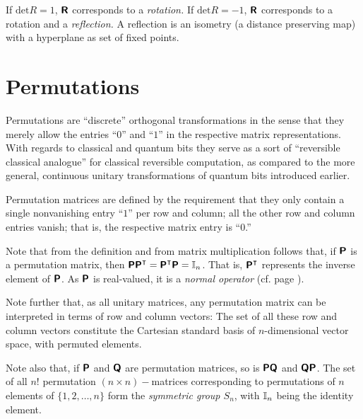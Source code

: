 If $\textrm{det} R=1$, $\textsf{\textbf{R}}$ corresponds to a {\em rotation.}
If $\textrm{det} R=-1$, $\textsf{\textbf{R}}$ corresponds to a rotation and a {\em reflection.}
A reflection is an isometry (a distance preserving map) with a hyperplane as set of fixed points.




\section{Permutations}
\label{2016-pu-ch-qm-perm}

Permutations are ``discrete'' orthogonal transformations in the sense that
they merely allow the entries ``$0$'' and ``$1$'' in the respective matrix representations.
With regards to classical and quantum bits \cite{mermin-04,mermin-07}
they serve as a sort of ``reversible classical analogue'' for classical reversible computation,
as compared to the more general, continuous unitary transformations of quantum bits introduced earlier.

Permutation matrices are defined by the requirement that they only contain a single nonvanishing entry ``$1$'' per row and column;
all the other row and column entries vanish; that is, the respective matrix entry is ``$0$.''


Note that from the definition and from matrix multiplication follows that,
if $\textsf{\textbf{P}}$ is a permutation matrix, then $\textsf{\textbf{P}} \textsf{\textbf{P}}^\intercal =\textsf{\textbf{P}}^\intercal  \textsf{\textbf{P}}={\Bbb I}_n$.
That is, $\textsf{\textbf{P}}^\intercal $ represents the inverse element of $\textsf{\textbf{P}}$.
As $\textsf{\textbf{P}}$ is real-valued, it is a {\em normal operator} (cf. page \pageref{2014-m-fdvs-normality}).


Note further that, as all unitary matrices, any permutation matrix can be interpreted in terms of row and column vectors:
The set of all these row and column vectors constitute the Cartesian standard basis of $n$-dimensional vector space,
with permuted elements.

Note also that, if $\textsf{\textbf{P}}$ and $\textsf{\textbf{Q}}$ are permutation matrices, so is $\textsf{\textbf{P}}\textsf{\textbf{Q}}$
and $\textsf{\textbf{Q}}\textsf{\textbf{P}}$.
The set of all $n!$
permutation $(n\times n)-$matrices corresponding to permutations of $n$ elements of $\{ 1,2,\ldots ,n\}$ form the
{\em symmetric group $S_n$}, with ${\Bbb I}_n$ being the identity element.


